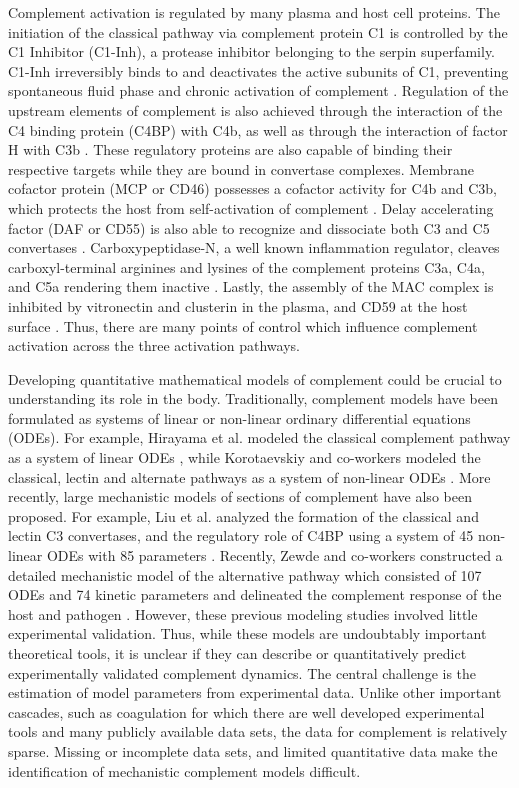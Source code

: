 \documentclass[12pt]{article}
\begin{document}
Complement activation is regulated by many plasma and host cell proteins.
The initiation of the classical pathway via complement protein C1 is controlled by the C1 Inhibitor (C1-Inh), a protease inhibitor belonging to the serpin superfamily.
C1-Inh irreversibly binds to and deactivates the active subunits of C1, preventing spontaneous fluid phase and chronic activation of complement \cite{walker1995complement}.
Regulation of the upstream elements of complement is also achieved through the interaction of the C4 binding protein (C4BP) with C4b, as well as
through the interaction of factor H with C3b \cite{blom2001structural}.
These regulatory proteins are also capable of binding their respective targets while they are bound in convertase complexes.
Membrane cofactor protein (MCP or CD46) possesses a cofactor activity for C4b and C3b, which protects the host from self-activation of complement \cite{riley2004cd46}.
Delay accelerating factor (DAF or CD55) is also able to recognize and dissociate both C3 and C5 convertases \cite{lukacik2004complement}.
Carboxypeptidase-N, a well known inflammation regulator, cleaves carboxyl-terminal arginines and lysines of the complement proteins C3a, C4a, and C5a rendering them inactive \cite{liszewski1995control}. Lastly, the assembly of the MAC complex is inhibited by vitronectin and clusterin in the plasma, and CD59 at the host surface \cite{chauhan2006presence,zewde2016quantitative}.
Thus, there are many points of control which influence complement activation across the three activation pathways.

Developing quantitative mathematical models of complement could be crucial to understanding its role in the body.
Traditionally, complement models have been formulated as systems of linear or non-linear ordinary differential equations (ODEs).
For example, Hirayama et al. modeled the classical complement pathway as a system of linear ODEs \cite{hirayama1996linear},
while Korotaevskiy and co-workers modeled the classical, lectin and alternate pathways as a system of non-linear ODEs \cite{korotaevskiy2009non}.
More recently, large mechanistic models of sections of complement have also been proposed.
For example, Liu et al. analyzed the formation of the classical and lectin C3 convertases, and the regulatory role of C4BP using a system of 45 non-linear ODEs with 85 parameters \cite{liu2011computational}.
Recently, Zewde and co-workers constructed a detailed mechanistic model of the alternative pathway which consisted of 107 ODEs and 74 kinetic parameters and delineated
the complement response of the host and pathogen \cite{zewde2016quantitative}.
However, these previous modeling studies involved little experimental validation.
Thus, while these models are undoubtably important theoretical tools, it is unclear if they can describe or quantitatively predict experimentally validated complement dynamics.
The central challenge is the estimation of model parameters from experimental data.
Unlike other important cascades, such as coagulation for which there are well developed experimental tools and many publicly available data sets,
the data for complement is relatively sparse. Missing or incomplete data sets, and limited quantitative data make the identification of mechanistic complement models difficult.
\end{document}
